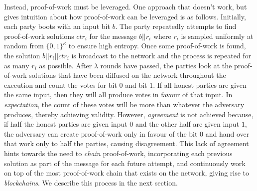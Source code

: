 Instead, proof-of-work must be leveraged. One approach that doesn't work, but
gives intuition about how proof-of-work can be leveraged is as follows.
Initially, each party boots with an input bit $b$. The party repeatedly attempts
to find proof-of-work solutions $ctr_i$ for the message $b || r_i$ where $r_i$
is sampled uniformly at random from $\{0, 1\}^\kappa$ to ensure high entropy.
Once some proof-of-work is found, the solution $b || r_i || ctr_i$ is broadcast
to the network and the process is repeated for as many $r_i$ as possible. After
$\lambda$ rounds have passed, the parties look at the proof-of-work solutions
that have been diffused on the network throughout the execution and count the
votes for bit $0$ and bit $1$. If all honest parties are given the same input,
then they will all produce votes in favour of that input. In \emph{expectation},
the count of these votes will be more than whatever the adversary produces,
thereby achieving validity. However, \emph{agreement} is not achieved because,
if half the honest parties are given input $0$ and the other half are given
input $1$, the adversary can create proof-of-work only in favour of the bit $0$
and hand over that work only to half the parties, causing disagreement. This
lack of agreement hints towards the need to \emph{chain} proof-of-work,
incorporating each previous solution as part of the message for each future
attempt, and continuously work on top of the most proof-of-work chain that
exists on the network, giving rise to \emph{blockchains}. We describe this
process in the next section.
